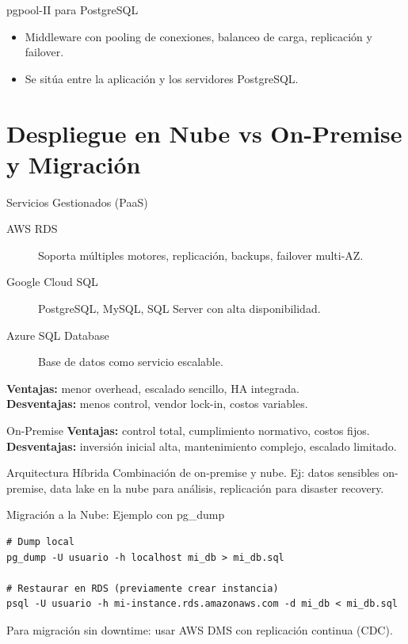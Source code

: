 \documentclass[aspectratio=169, 10pt, xcolor=table]{beamer}
\begin{document}
\begin{frame}{pgpool-II para PostgreSQL}
    \begin{itemize}
        \item Middleware con pooling de conexiones, balanceo de carga, replicación y failover.
        \item Se sitúa entre la aplicación y los servidores PostgreSQL.
    \end{itemize}
\end{frame}

\section{Despliegue en Nube vs On-Premise y Migración}

\begin{frame}{Servicios Gestionados (PaaS)}
    \begin{description}
        \item[AWS RDS] Soporta múltiples motores, replicación, backups, failover multi-AZ.
        \item[Google Cloud SQL] PostgreSQL, MySQL, SQL Server con alta disponibilidad.
        \item[Azure SQL Database] Base de datos como servicio escalable.
    \end{description}
    \textbf{Ventajas:} menor overhead, escalado sencillo, HA integrada. \\
    \textbf{Desventajas:} menos control, vendor lock-in, costos variables.
\end{frame}

\begin{frame}{On-Premise}
    \textbf{Ventajas:} control total, cumplimiento normativo, costos fijos. \\
    \textbf{Desventajas:} inversión inicial alta, mantenimiento complejo, escalado limitado.
\end{frame}

\begin{frame}{Arquitectura Híbrida}
    Combinación de on-premise y nube. Ej: datos sensibles on-premise, data lake en la nube para análisis, replicación para disaster recovery.
\end{frame}

\begin{frame}[fragile]{Migración a la Nube: Ejemplo con pg\_dump}
    \begin{lstlisting}[style=bashstyle]
# Dump local
pg_dump -U usuario -h localhost mi_db > mi_db.sql

# Restaurar en RDS (previamente crear instancia)
psql -U usuario -h mi-instance.rds.amazonaws.com -d mi_db < mi_db.sql
    \end{lstlisting}
    Para migración sin downtime: usar AWS DMS con replicación continua (CDC).
\end{frame}
\end{document}
